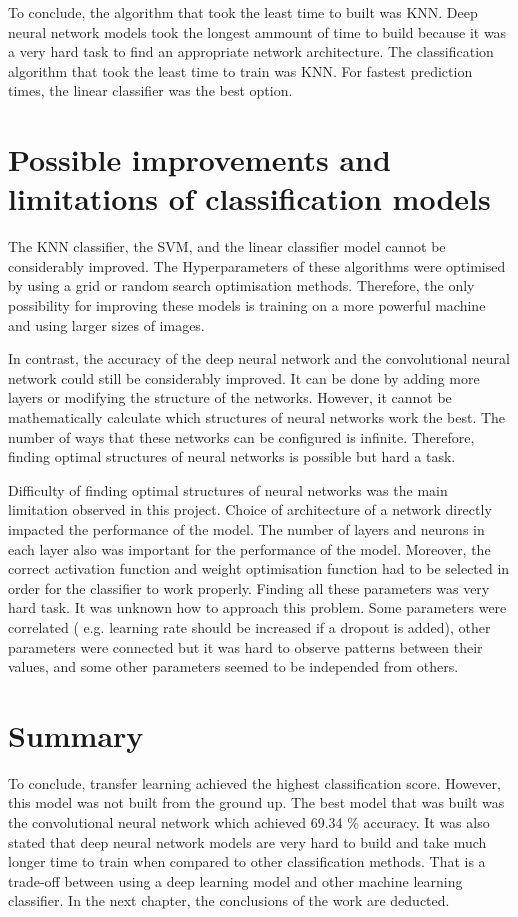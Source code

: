 To conclude, the algorithm that took the least time to built was KNN. Deep neural network models  took the longest ammount of time to build  because it was a very hard task to find an appropriate network architecture. The classification algorithm that took the least time to train was KNN. For fastest prediction times, the linear classifier was the best option.

\section{Possible improvements and limitations of classification models}

The KNN classifier, the SVM,  and the linear classifier model cannot be considerably improved. The Hyperparameters of these algorithms were optimised by using a grid or random search optimisation methods. Therefore, the only possibility for improving these models is training  on a more powerful machine and  using  larger sizes of  images.

In contrast,  the accuracy of the deep neural network and the convolutional neural network could still be considerably improved. It can be done by adding more layers or modifying the structure of the networks. However, it cannot be mathematically calculate which structures of neural networks work the best. The number of ways that these networks can be configured is infinite. Therefore, finding optimal structures of neural networks is possible but hard a task.

Difficulty of finding optimal structures of neural networks was the main limitation observed in this project. Choice of  architecture of a network directly impacted the performance of the model. The number of layers and  neurons in each layer also was important for the  performance of the model. Moreover, the correct activation function and weight optimisation function had to be selected in order for the  classifier to work properly. Finding all these parameters was very hard task. It was unknown how to approach this problem. Some parameters were correlated ( e.g. learning rate should be increased if a dropout is added), other parameters were connected but it was hard to observe patterns between their values, and some other parameters seemed to be independed from others. 

\section{Summary}

To conclude, transfer learning achieved the highest classification score. However, this model was not built from the ground up. The best model that was built was the convolutional neural network which achieved 69.34 \% accuracy.  It was also stated that deep neural network models are very hard to build and take much longer time to train when compared to other classification methods. That is a trade-off between using a deep learning model and other machine learning classifier. In the next chapter, the conclusions of the work are deducted.
